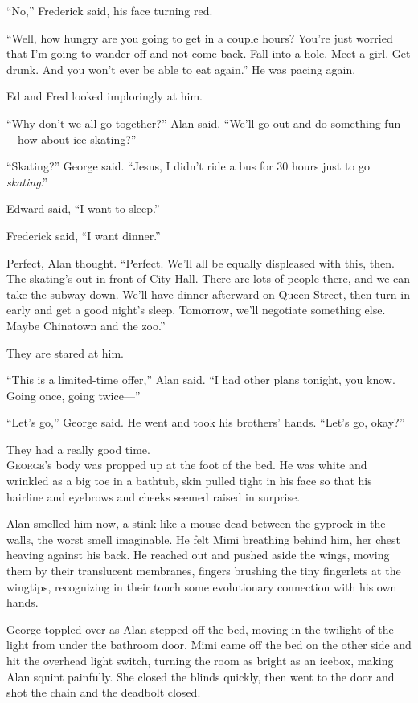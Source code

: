 ``No,'' Frederick said, his face turning red.

``Well, how hungry are you going to get in a couple hours?  You're
just worried that I'm going to wander off and not come back.  Fall
into a hole.  Meet a girl.  Get drunk.  And you won't ever be able to
eat again.'' He was pacing again.

Ed and Fred looked imploringly at him.

``Why don't we all go together?'' Alan said.  ``We'll go out and do
something fun---how about ice-skating?''

``Skating?'' George said.  ``Jesus, I didn't ride a bus for 30 hours
just to go \textit{skating}.''

Edward said, ``I want to sleep.''

Frederick said, ``I want dinner.''

Perfect, Alan thought.  ``Perfect.  We'll all be equally displeased
with this, then.  The skating's out in front of City Hall.  There are
lots of people there, and we can take the subway down.  We'll have
dinner afterward on Queen Street, then turn in early and get a good
night's sleep.  Tomorrow, we'll negotiate something else.  Maybe
Chinatown and the zoo.''

They are stared at him.

``This is a limited-time offer,'' Alan said.  ``I had other plans
tonight, you know.  Going once, going twice---''

``Let's go,'' George said.  He went and took his brothers' hands. 
``Let's go, okay?''

They had a really good time.
\\
\lettrine[lines=3, lhang=.5, nindent=0pt, findent=2pt]{G}{eorge}'s body was propped up at the foot of the bed.  He was white and
wrinkled as a big toe in a bathtub, skin pulled tight in his face so
that his hairline and eyebrows and cheeks seemed raised in surprise.

Alan smelled him now, a stink like a mouse dead between the gyprock in
the walls, the worst smell imaginable.  He felt Mimi breathing behind
him, her chest heaving against his back.  He reached out and pushed
aside the wings, moving them by their translucent membranes, fingers
brushing the tiny fingerlets at the wingtips, recognizing in their
touch some evolutionary connection with his own hands.

George toppled over as Alan stepped off the bed, moving in the
twilight of the light from under the bathroom door.  Mimi came off the
bed on the other side and hit the overhead light switch, turning the
room as bright as an icebox, making Alan squint painfully.  She closed
the blinds quickly, then went to the door and shot the chain and the
deadbolt closed.


